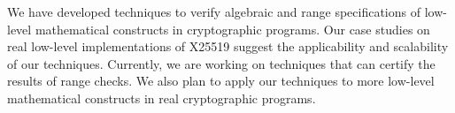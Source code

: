 
We have developed techniques to verify algebraic and range specifications of
low-level mathematical constructs in cryptographic programs. Our case
studies on real low-level implementations of X25519 suggest the
applicability and scalability of our techniques. Currently, we are
working on techniques that can certify the results of range checks. We also plan to
apply our techniques to more low-level mathematical constructs in real
cryptographic programs.